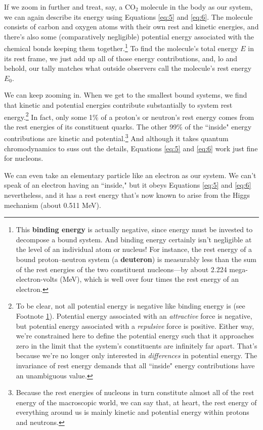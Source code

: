 \documentclass[12pt]{article}
\begin{document}
If we zoom in further and treat, say, a CO$_2$ molecule in the body as our system, we can again describe its energy using Equations \ref{eq:5} and \ref{eq:6}. The molecule consists of carbon and oxygen atoms with their own rest and kinetic energies, and there's also some (comparatively negligible) potential energy associated with the chemical bonds keeping them together.\footnote{\label{fn:be}This \textbf{binding energy} is actually negative, since energy must be invested to decompose a bound system. And binding energy certainly isn't negligible at the level of an individual atom or nucleus! For instance, the rest energy of a bound proton--neutron system (a \textbf{deuteron}) is measurably less than the sum of the rest energies of the two constituent nucleons---by about 2.224 mega-electron-volts (MeV), which is well over four times the rest energy of an electron.} To find the molecule's total energy $E$ in its rest frame, we just add up all of those energy contributions, and, lo and behold, our tally matches what outside observers call the molecule's rest energy $E_0$.

We can keep zooming in. When we get to the smallest bound systems, we find that kinetic and potential energies contribute substantially to system rest energy.\footnote{To be clear, not all potential energy is negative like binding energy is (see Footnote \ref{fn:be}). Potential energy associated with an \emph{attractive} force is negative, but potential energy associated with a \emph{repulsive} force is positive. Either way, we're constrained here to define the potential energy such that it approaches zero in the limit that the system's constituents are infinitely far apart. That's because we're no longer only interested in \emph{differences} in potential energy. The invariance of rest energy demands that all ``inside" energy contributions have an unambiguous value.} In fact, only some 1\% of a proton's or neutron's rest energy comes from the rest energies of its constituent quarks. The other 99\% of the ``inside" energy contributions are kinetic and potential.\footnote{\label{fn:mwm}Because the rest energies of nucleons in turn constitute almost all of the rest energy of the macroscopic world, we can say that, at heart, the rest energy of everything around us is mainly kinetic and potential energy within protons and neutrons.} And although it takes quantum chromodynamics to suss out the details, Equations \ref{eq:5} and \ref{eq:6} work just fine for nucleons.

We can even take an elementary particle like an electron as our system. We can't speak of an electron having an ``inside," but it obeys Equations \ref{eq:5} and \ref{eq:6} nevertheless, and it has a rest energy that's now known to arise from the Higgs mechanism (about 0.511 MeV).
\end{document}
